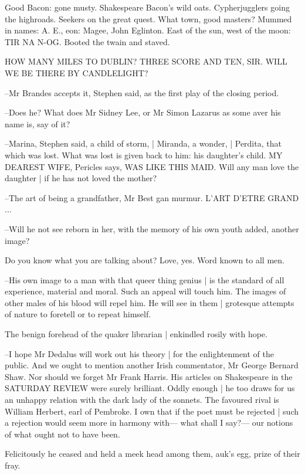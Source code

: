 Good Bacon:
gone musty.
Shakespeare Bacon's wild oats.
Cypherjugglers going the highroads.
Seekers on the great quest.
What town,
good masters?
Mummed in names:
A. E.,
eon:
Magee,
John Eglinton.
East of the sun,
west of the moon:
TIR NA N-OG.
Booted the twain and staved.


    HOW MANY MILES TO DUBLIN?
    THREE SCORE AND TEN, SIR.
    WILL WE BE THERE BY CANDLELIGHT?


--Mr Brandes accepts it,
Stephen said,
as the first play of the closing period.

--Does he?
What does Mr Sidney Lee,
or Mr Simon Lazarus as some aver his name is,
say of it?

--Marina,
Stephen said,
a child of storm, |
Miranda, a wonder, |
Perdita, that which was lost.
What was lost is given back to him:
his daughter's child.
MY DEAREST WIFE,
Pericles says,
WAS LIKE THIS MAID.
Will any man love the daughter |
if he has not loved the mother?

--The art of being a grandfather,
Mr Best gan murmur.
L'ART D'ETRE GRAND ...

--Will he not see reborn in her,
with the memory of his own youth added,
another image?

Do you know what you are talking about?
Love,
yes.
Word known to all men.

--His own image to a man with that queer thing genius |
is the standard of all experience,
material and moral.
Such an appeal will touch him.
The images of other males of his blood will repel him.
He will see in them |
grotesque attempts of nature to foretell or to repeat himself.

The benign forehead of the quaker librarian |
enkindled rosily with hope.

--I hope Mr Dedalus will work out his theory |
for the enlightenment of the public.
And we ought to mention another Irish commentator,
Mr George Bernard Shaw.
Nor should we forget Mr Frank Harris.
His articles on Shakespeare in the SATURDAY REVIEW were surely brilliant.
Oddly enough |
he too draws for us an unhappy relation with the dark lady of the sonnets.
The favoured rival is William Herbert, earl of Pembroke.
I own that if the poet must be rejected |
such a rejection would seem more in harmony with—%
what shall I say?—%
our notions of what ought not to have been.

Felicitously he ceased and held a meek head among them,
auk's egg,
prize of their fray.

